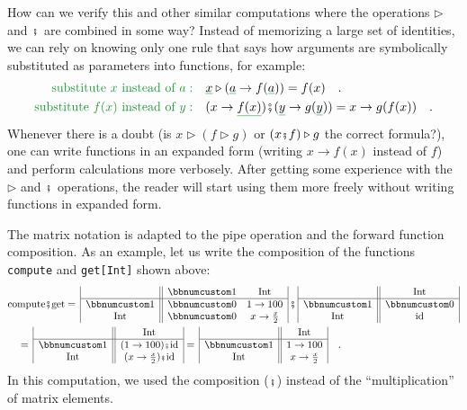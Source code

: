 How can we verify this and other similar computations where the operations
$\triangleright$ and $\bef$ are combined in some way? Instead of
memorizing a large set of identities, we can rely on knowing only
one rule that says how arguments are symbolically substituted as parameters
into functions, for example:
\begin{align*}
{\color{greenunder}\text{substitute }x\text{ instead of }a:}\quad & \gunderline x\triangleright(\gunderline a\rightarrow f(\gunderline a))=f(x)\quad.\\
{\color{greenunder}\text{substitute }f(x)\text{ instead of }y:}\quad & (x\rightarrow\gunderline{f(x)})\bef(\gunderline y\rightarrow g(\gunderline y))=x\rightarrow g(f(x))\quad.
\end{align*}
Whenever there is a doubt (is $x\triangleright(f\triangleright g)$
or $(x\bef f)\triangleright g$ the correct formula?), one can write
functions in an expanded form (writing $x\rightarrow f(x)$ instead
of $f$) and perform calculations more verbosely. After getting some
experience with the $\triangleright$ and $\bef$ operations, the
reader will start using them more freely without writing functions
in expanded form.

The matrix notation is adapted to the pipe operation and the forward
function composition. As an example, let us write the composition
of the functions \lstinline!compute! and \lstinline!get[Int]! shown
above: 
\begin{align*}
 & \text{compute}\bef\text{get}=\,\begin{array}{|c||cc|}
 & \bbnum 1 & \text{Int}\\
\hline \bbnum 1 & \bbnum 0 & 1\rightarrow100\\
\text{Int} & \bbnum 0 & x\rightarrow\frac{x}{2}
\end{array}\,\bef\,\begin{array}{|c||c|}
 & \text{Int}\\
\hline \bbnum 1 & \bbnum 0\\
\text{Int} & \text{id}
\end{array}\\
 & \quad=\,\begin{array}{|c||c|}
 & \text{Int}\\
\hline \bbnum 1 & (1\rightarrow100)\bef\text{id}\\
\text{Int} & (x\rightarrow\frac{x}{2})\bef\text{id}
\end{array}=\,\begin{array}{|c||c|}
 & \text{Int}\\
\hline \bbnum 1 & 1\rightarrow100\\
\text{Int} & x\rightarrow\frac{x}{2}
\end{array}\quad.
\end{align*}
In this computation, we used the composition ($\bef$) instead of
the \textsf{``}multiplication\textsf{''} of matrix elements.

